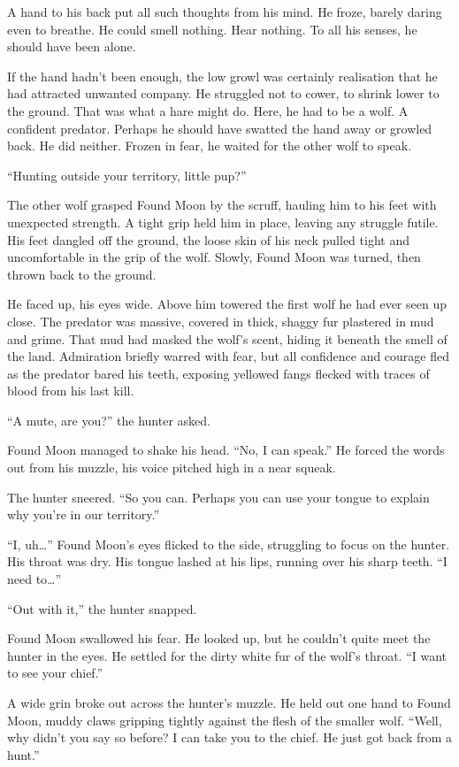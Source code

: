 A hand to his back put all such thoughts from his mind. He froze, barely daring even to breathe. He could smell nothing. Hear nothing. To all his senses, he should have been alone.

If the hand hadn't been enough, the low growl was certainly realisation that he had attracted unwanted company. He struggled not to cower, to shrink lower to the ground. That was what a hare might do. Here, he had to be a wolf. A confident predator. Perhaps he should have swatted the hand away or growled back. He did neither. Frozen in fear, he waited for the other wolf to speak.

``Hunting outside your territory, little pup?''

The other wolf grasped Found Moon by the scruff, hauling him to his feet with unexpected strength. A tight grip held him in place, leaving any struggle futile. His feet dangled off the ground, the loose skin of his neck pulled tight and uncomfortable in the grip of the wolf. Slowly, Found Moon was turned, then thrown back to the ground.

He faced up, his eyes wide. Above him towered the first wolf he had ever seen up close. The predator was massive, covered in thick, shaggy fur plastered in mud and grime. That mud had masked the wolf's scent, hiding it beneath the smell of the land. Admiration briefly warred with fear, but all confidence and courage fled as the predator bared his teeth, exposing yellowed fangs flecked with traces of blood from his last kill.

``A mute, are you?'' the hunter asked.

Found Moon managed to shake his head. ``No, I can speak.'' He forced the words out from his muzzle, his voice pitched high in a near squeak.

The hunter sneered. ``So you can. Perhaps you can use your tongue to explain why you're in our territory.''

``I, uh\ldots'' Found Moon's eyes flicked to the side, struggling to focus on the hunter. His throat was dry. His tongue lashed at his lips, running over his sharp teeth. ``I need to\ldots''

``Out with it,'' the hunter snapped.

Found Moon swallowed his fear. He looked up, but he couldn't quite meet the hunter in the eyes. He settled for the dirty white fur of the wolf's throat. ``I want to see your chief.''

A wide grin broke out across the hunter's muzzle. He held out one hand to Found Moon, muddy claws gripping tightly against the flesh of the smaller wolf. ``Well, why didn't you say so before? I can take you to the chief. He just got back from a hunt.''

